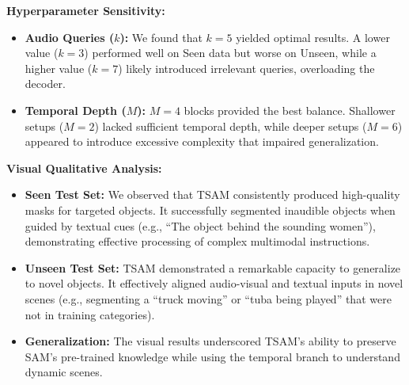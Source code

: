 \vspace{0.5em}
\noindent\textbf{Hyperparameter Sensitivity:}
\begin{itemize}
    \item \textbf{Audio Queries ($k$):} We found that $k=5$ yielded optimal results. A lower value ($k=3$) performed well on Seen data but worse on Unseen, while a higher value ($k=7$) likely introduced irrelevant queries, overloading the decoder.
    \item \textbf{Temporal Depth ($M$):} $M=4$ blocks provided the best balance. Shallower setups ($M=2$) lacked sufficient temporal depth, while deeper setups ($M=6$) appeared to introduce excessive complexity that impaired generalization.
\end{itemize}

\vspace{0.5em}
\noindent\textbf{Visual Qualitative Analysis:}
\begin{itemize}
    \item \textbf{Seen Test Set:} We observed that TSAM consistently produced high-quality masks for targeted objects. It successfully segmented inaudible objects when guided by textual cues (e.g., ``The object behind the sounding women''), demonstrating effective processing of complex multimodal instructions.
    \item \textbf{Unseen Test Set:} TSAM demonstrated a remarkable capacity to generalize to novel objects. It effectively aligned audio-visual and textual inputs in novel scenes (e.g., segmenting a ``truck moving'' or ``tuba being played'' that were not in training categories).
    \item \textbf{Generalization:} The visual results underscored TSAM's ability to preserve SAM's pre-trained knowledge while using the temporal branch to understand dynamic scenes.
\end{itemize}